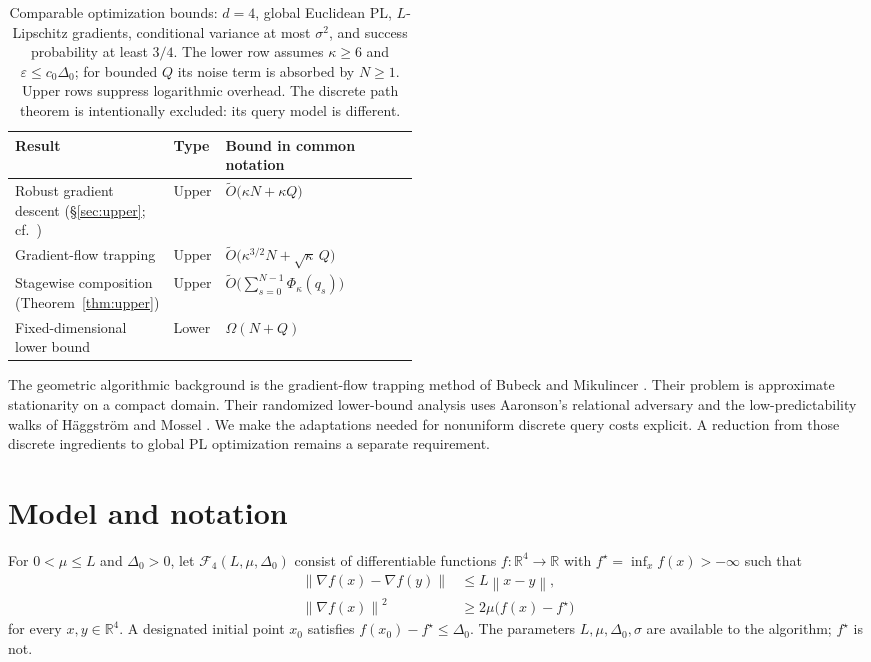\documentclass[11pt,a4paper]{article}
\newcommand{\R}{\mathbb R}
\newcommand{\eps}{\varepsilon}
\newcommand{\norm}[1]{\left\lVert #1\right\rVert}
\newcommand{\tO}{\widetilde O}
\theoremstyle{definition}
\theoremstyle{remark}
\begin{document}
\begin{table}[tb]
\centering
\small
\renewcommand{\arraystretch}{1.22}
\begin{tabularx}{\linewidth}{@{}p{0.35\linewidth}p{0.12\linewidth}Y@{}}
\toprule
Result & Type & Bound in common notation\\
\midrule
Robust gradient descent
(\S\ref{sec:upper}; cf.\ \cite{ouwang2026})
& Upper & $\tO\bigl(\kappa N+\kappa Q\bigr)$\\
Gradient-flow trapping
\cite[Theorem 5.2(ii)]{ouwang2026}
& Upper & $\tO\bigl(\kappa^{3/2}N+\sqrt\kappa\,Q\bigr)$\\
Stagewise composition
(Theorem~\ref{thm:upper})
& Upper & $\tO\bigl(\sum_{s=0}^{N-1}\Phi_\kappa(q_s)\bigr)$\\
Fixed-dimensional lower bound
\cite[Theorem 5.1]{ouwang2026}
& Lower & $\Omega(N+Q)$\\
\bottomrule
\end{tabularx}
\caption{Comparable optimization bounds: $d=4$, global Euclidean PL,
$L$-Lipschitz gradients, conditional variance at most $\sigma^2$,
and success probability at least $3/4$.  The lower row assumes
$\kappa\ge6$ and $\eps\le c_0\Delta_0$; for bounded $Q$ its noise term
is absorbed by $N\ge1$.  Upper rows suppress logarithmic overhead.
The discrete path theorem is intentionally excluded: its query
model is different.}
\label{tab:comparison}
\end{table}

The geometric algorithmic background is the gradient-flow trapping
method of Bubeck and Mikulincer \cite{bubeck2020}.  Their problem is
approximate stationarity on a compact domain.  Their randomized
lower-bound analysis uses Aaronson's relational adversary
\cite{aaronson2006} and the low-predictability walks of
H\"aggstr\"om and Mossel \cite{haggstrom1998}.
We make the adaptations needed for nonuniform discrete query costs
explicit.  A reduction from those discrete ingredients to global PL
optimization remains a separate requirement.

\section{Model and notation}
\label{sec:model}

For $0<\mu\le L$ and $\Delta_0>0$, let
$\mathcal F_4(L,\mu,\Delta_0)$ consist of differentiable functions
$f:\R^4\to\R$ with $f^\star=\inf_x f(x)>-\infty$ such that
\begin{align}
 \norm{\nabla f(x)-\nabla f(y)}
 &\le L\norm{x-y}, \label{eq:smoothness}\\
 \norm{\nabla f(x)}^2
 &\ge2\mu\bigl(f(x)-f^\star\bigr) \label{eq:pl}
\end{align}
for every $x,y\in\R^4$.  A designated initial point $x_0$ satisfies
$f(x_0)-f^\star\le\Delta_0$.  The parameters $L,\mu,\Delta_0,\sigma$
are available to the algorithm; $f^\star$ is not.
\end{document}
